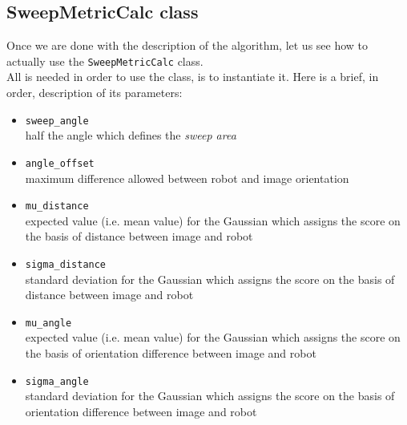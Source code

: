 \subsection{SweepMetricCalc class}
\label{concr:iimageselector:sweep_metric_class}

Once we are done with the description of the algorithm, 
let us see how to actually use the \texttt{SweepMetricCalc} 
class.
\\
All is needed in order to use the class, is to instantiate it.
Here is a brief, in order, description of its parameters:

\begin{itemize}
  \item \texttt{sweep\_angle} \\
    half the angle which defines the \textit{sweep area}
  \item \texttt{angle\_offset} \\
    maximum difference allowed between robot and 
    image orientation 
  \item \texttt{mu\_distance} \\
    expected value (i.e. mean value) for the Gaussian 
    which assigns the score on the basis of distance between
    image and robot
  \item \texttt{sigma\_distance} \\
    standard deviation for the Gaussian which assigns the 
    score on the basis of distance between image and robot
  \item \texttt{mu\_angle} \\
    expected value (i.e. mean value) for the Gaussian which 
    assigns the score on the basis of orientation difference
    between image and robot
  \item \texttt{sigma\_angle} \\
    standard deviation for the Gaussian which assigns the 
    score on the basis of orientation difference between image
    and robot
\end{itemize}

